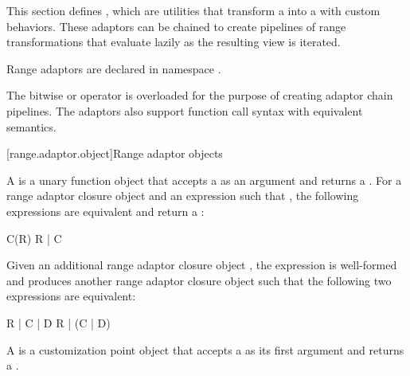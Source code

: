 \pnum
This section defines , which are utilities that transform a
 into a  with custom behaviors. These
adaptors can be chained to create pipelines of range transformations that
evaluate lazily as the resulting view is iterated.

\pnum
Range adaptors are declared in namespace .

\pnum
The bitwise or operator is overloaded for the purpose of creating adaptor chain
pipelines. The adaptors also support function call syntax with equivalent
semantics.

\pnum
\begin{example}
\end{example}

[range.adaptor.object]{Range adaptor objects}

\pnum
A  is a unary function object that accepts
a  as an argument and returns a . For
a range adaptor closure object  and an expression  such that
   , the following
expressions are equivalent and return a :

\begin{codeblock}
C(R)
R | C
\end{codeblock}

Given an additional range adaptor closure object ,
the expression  is well-formed and produces another range adaptor
closure object such that the following two expressions are equivalent:

\begin{codeblock}
R | C | D
R | (C | D)
\end{codeblock}

\pnum
A  is a
customization point object
that accepts a  as its first argument and returns a
.

